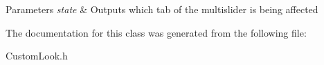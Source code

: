 \begin{DoxyParams}{Parameters}
{\em state} & Outputs which tab of the multislider is being affected \\
\hline
\end{DoxyParams}


The documentation for this class was generated from the following file\+:\begin{DoxyCompactItemize}
\item 
Custom\+Look.\+h\end{DoxyCompactItemize}
